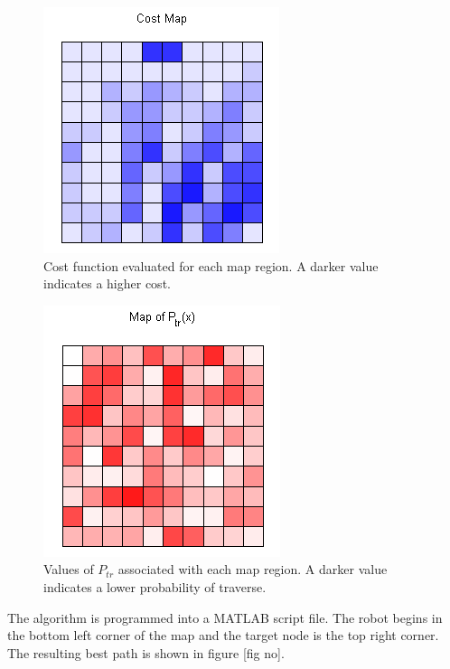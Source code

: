\documentclass[journal]{IEEEtran}
\begin{document}
\begin{figure}[h!]
\label{cost_map}
\centering
\includegraphics[scale=1.5]{cost_map}
\caption{Cost function evaluated for each map region. A darker value indicates a higher cost.}
\end{figure}

\begin{figure}[h!]
\label{Ptr_map}
\centering
\includegraphics[scale=1]{P_tr_map}
\caption{Values of $P_{tr}$ associated with each map region. A darker value indicates a lower probability of traverse.}

\end{figure}


The algorithm is programmed into a MATLAB script file. 
The robot begins in the bottom left corner of the map and the target node is the top right corner.
The resulting best path is shown in figure [fig no].
\end{document}
